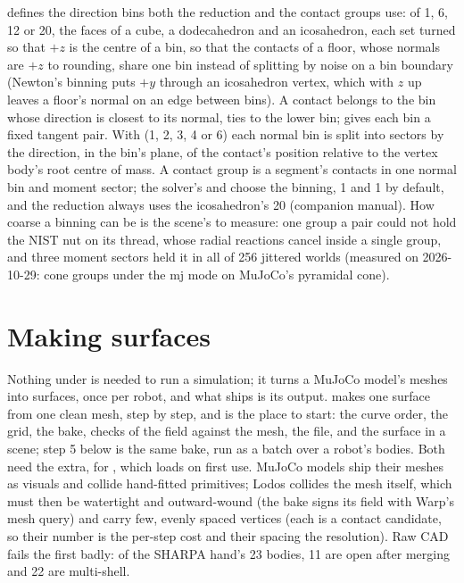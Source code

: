  defines the direction bins both the reduction and the contact groups use:  of 1, 6, 12 or 20, the faces of a cube, a dodecahedron and an icosahedron, each set turned so that $+z$ is the centre of a bin, so that the contacts of a floor, whose normals are $+z$ to rounding, share one bin instead of splitting by noise on a bin boundary (Newton's binning puts $+y$ through an icosahedron vertex, which with $z$ up leaves a floor's normal on an edge between bins). A contact belongs to the bin whose direction is closest to its normal, ties to the lower bin;  gives each bin a fixed tangent pair. With  (1, 2, 3, 4 or 6) each normal bin is split into sectors by the direction, in the bin's plane, of the contact's position relative to the vertex body's root centre of mass. A contact group is a segment's contacts in one normal bin and moment sector; the solver's  and  choose the binning, 1 and 1 by default, and the reduction always uses the icosahedron's 20 (companion manual). How coarse a binning can be is the scene's to measure: one group a pair could not hold the NIST nut on its thread, whose radial reactions cancel inside a single group, and three moment sectors held it in all of 256 jittered worlds (measured on 2026-10-29: cone groups under the mj mode on MuJoCo's pyramidal cone).

\section{Making surfaces}\label{sec:meshprep}

Nothing under  is needed to run a simulation; it turns a MuJoCo model's meshes into surfaces, once per robot, and what ships is its output.  makes one surface from one clean mesh, step by step, and is the place to start: the curve order, the grid, the bake, checks of the field against the mesh, the file, and the surface in a scene; step 5 below is the same bake, run as a batch over a robot's bodies. Both need the  extra, for , which loads on first use. MuJoCo models ship their meshes as visuals and collide hand-fitted primitives; Lodos collides the mesh itself, which must then be watertight and outward-wound (the bake signs its field with Warp's mesh query) and carry few, evenly spaced vertices (each is a contact candidate, so their number is the per-step cost and their spacing the resolution). Raw CAD fails the first badly: of the SHARPA hand's 23 bodies, 11 are open after merging and 22 are multi-shell.

